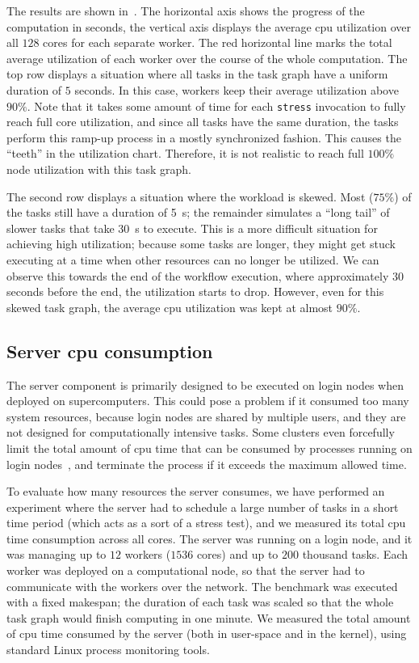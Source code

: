 The results are shown in~. The horizontal axis shows the progress of the
computation in seconds, the vertical axis displays the average \gls{cpu} utilization
over all $128$ cores for each separate worker. The red horizontal line marks the
total average utilization of each worker over the course of the whole computation. The top row
displays a situation where all tasks in the task graph have a uniform duration of
$5$ seconds. In this case, \hyperqueue{} workers keep their average
utilization above $90\%$. Note that it takes some amount of time for each
\texttt{stress} invocation to fully reach full core utilization, and since all tasks have
the same duration, the tasks perform this ramp-up process in a mostly synchronized fashion. This
causes the ``teeth'' in the utilization chart. Therefore, it is not realistic to reach full
$100\%$ node utilization with this task graph.

The second row displays a situation where the workload is skewed. Most ($75\%$) of
the tasks still have a duration of \SI{5}{\second}; the remainder simulates a ``long tail''
of slower tasks that take \SI{30}{\second} to execute. This is a more difficult situation
for achieving high utilization; because some tasks are longer, they might get stuck executing at a
time when other resources can no longer be utilized. We can observe this towards the end of the
workflow execution, where approximately $30$ seconds before the end, the
utilization starts to drop. However, even for this skewed task graph, the average
\gls{cpu} utilization was kept at almost $90\%$.

\subsection{Server \gls{cpu} consumption}
\label{sec:hq-exp-server-cpu-consumption}
The \hyperqueue{} server component is primarily designed to be executed on login nodes
when deployed on supercomputers. This could pose a problem if it consumed too many system
resources, because login nodes are shared by multiple users, and they are not designed for
computationally intensive tasks. Some clusters even forcefully limit the total amount of
\gls{cpu} time that can be consumed by processes running on login
nodes~\cite{leonardo_time_limit}, and terminate the process if it exceeds the maximum allowed time.

To evaluate how many resources the server consumes, we have performed an experiment where the
server had to schedule a large number of tasks in a short time period (which acts as a sort of a
stress test), and we measured its total \gls{cpu} time consumption across all cores.
The server was running on a login node, and it was managing up to $12$ workers
($1536$ cores) and up to $200$ thousand tasks. Each worker was
deployed on a computational node, so that the server had to communicate with the workers over the
network. The benchmark was executed with a fixed makespan; the duration of each task was scaled so
that the whole task graph would finish computing in one minute. We measured the total amount of
\gls{cpu} time consumed by the server (both in user-space and in the kernel), using
standard Linux process monitoring tools.

